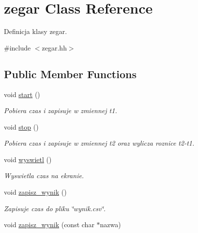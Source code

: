 \hypertarget{classzegar}{\section{zegar \-Class \-Reference}
\label{classzegar}
}


\-Definicja klasy zegar.  




{\ttfamily \#include $<$zegar.\-hh$>$}

\subsection*{\-Public \-Member \-Functions}
\begin{DoxyCompactItemize}
\item 
void \hyperlink{classzegar_a20f54bf635dd6b8fa3729a898dee0b02}{start} ()
\begin{DoxyCompactList}\small\item\em \-Pobiera czas i zapisuje w zmiennej t1. \end{DoxyCompactList}\item 
void \hyperlink{classzegar_a11470b47ba97baeb33376062c8765e29}{stop} ()
\begin{DoxyCompactList}\small\item\em \-Pobiera czas i zapisuje w zmiennej t2 oraz wylicza roznice t2-\/t1. \end{DoxyCompactList}\item 
void \hyperlink{classzegar_adefab1d01ca1e95b6a6cf31c7322f78d}{wyswietl} ()
\begin{DoxyCompactList}\small\item\em \-Wyswietla czas na ekranie. \end{DoxyCompactList}\item 
void \hyperlink{classzegar_af63513dc1f53641aad781ebf8c502c27}{zapisz\-\_\-wynik} ()
\begin{DoxyCompactList}\small\item\em \-Zapisuje czas do pliku \char`\"{}wynik.\-csv\char`\"{}. \end{DoxyCompactList}\item 
void \hyperlink{classzegar_a8b17a25c75a2866f6660fff4230e4155}{zapisz\-\_\-wynik} (const char $\ast$nazwa)
\end{DoxyCompactItemize}

